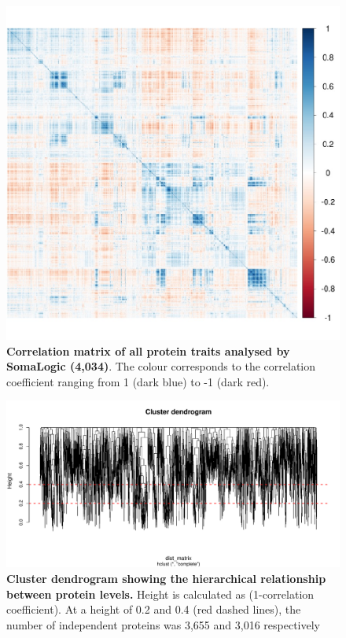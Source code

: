 \documentclass[11pt,twoside]{bristolthesis}
\newcommand{\blandscape}{\begin{landscape}}
\newcommand{\elandscape}{\end{landscape}}
\begin{document}
\begin{figure}

{\centering \includegraphics[width=0.9\linewidth]{figure/BMI_protein_INTERVAL/Correlation_matrix_proteins} 

}

\caption[Correlation matrix of all protein traits analysed by SomaLogic]{\textbf{Correlation matrix of all protein traits analysed by SomaLogic (4,034)}. The colour corresponds to the correlation coefficient ranging from 1 (dark blue) to -1 (dark red).}\label{fig:Corr-mat-proteins}
\end{figure}
\blandscape



\begin{figure}

{\centering \includegraphics[width=0.95\linewidth]{figure/BMI_protein_INTERVAL/dendrogram} 

}

\caption[Cluster dendrogram showing the hierarchical relationship between protein levels]{\textbf{Cluster dendrogram showing the hierarchical relationship between protein levels.} Height is calculated as (1-correlation coefficient). At a height of 0.2 and 0.4 (red dashed lines), the number of independent proteins was 3,655 and 3,016 respectively}\label{fig:Dend-proteins}
\end{figure}
\elandscape
\end{document}
